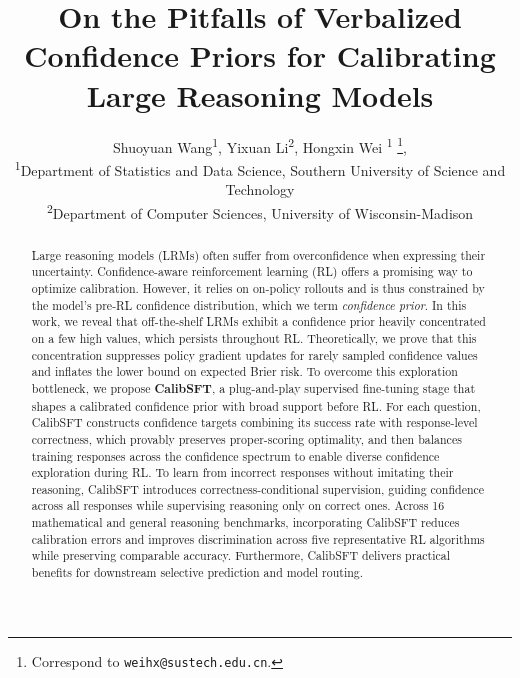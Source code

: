 \documentclass{article} %
\title{On the Pitfalls of Verbalized Confidence Priors for Calibrating Large Reasoning Models}
\author{
  Shuoyuan Wang\textsuperscript{1},\enspace
  Yixuan Li\textsuperscript{2},\enspace
  Hongxin Wei \textsuperscript{1 }\thanks{Correspond to \texttt{weihx@sustech.edu.cn}.}, \enspace \\
  \textsuperscript{1}Department of Statistics and Data Science, Southern University of Science and Technology  \\
  \textsuperscript{2}Department of Computer Sciences, University of Wisconsin-Madison\\
}
\begin{document}
\maketitle

\begin{abstract}
Large reasoning models (LRMs) often suffer from overconfidence when expressing their uncertainty.
Confidence-aware reinforcement learning (RL) offers a promising way to optimize calibration.
However, it relies on on-policy rollouts and is thus constrained by the model's pre-RL confidence distribution, which we term \emph{confidence prior}.
In this work, we reveal that off-the-shelf LRMs exhibit a confidence prior heavily concentrated on a few high values, which persists throughout RL.
Theoretically, we prove that this concentration suppresses policy gradient updates for rarely sampled confidence values and inflates the lower bound on expected Brier risk.
To overcome this exploration bottleneck, we propose \textbf{CalibSFT}, a plug-and-play supervised fine-tuning stage that shapes a calibrated confidence prior with broad support before RL.
For each question, CalibSFT constructs confidence targets combining its success rate with response-level correctness, which provably preserves proper-scoring optimality, and then balances training responses across the confidence spectrum to enable diverse confidence exploration during RL.
To learn from incorrect responses without imitating their reasoning, CalibSFT introduces correctness-conditional supervision, guiding confidence across all responses while supervising reasoning only on correct ones.
Across 16 mathematical and general reasoning benchmarks, incorporating CalibSFT reduces calibration errors and improves discrimination across five representative RL algorithms while preserving comparable accuracy.
Furthermore, CalibSFT delivers practical benefits for downstream selective prediction and model routing.
\end{abstract}



\end{document}
